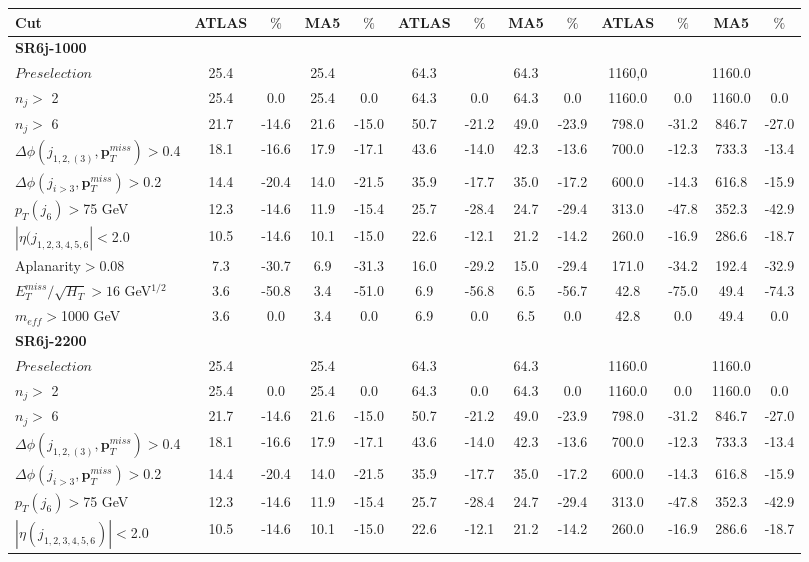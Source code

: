 \documentclass[a4paper,11pt]{article}
\begin{document}
\begin{landscape}
\begin{table}[h]
\begin{tabular}{ | l | c c c c  || c c c c || c c c c | }
			\textbf{Cut} & \textbf{ATLAS} & $\%$ & \textbf{MA5} & $\%$ & \textbf{ATLAS} & $\%$ & \textbf{MA5} & $\%$ & \textbf{ATLAS} & $\%$ & \textbf{MA5} & $\%$ \\ \hline \hline
											\multicolumn{13}{|l|}{\textbf{SR6j-1000}} \\ \hline		
$Preselection$&25.4&&25.4&&64.3&&64.3&&1160,0&&1160.0&
\\
$n_j>$ 2&25.4&0.0&25.4&0.0&64.3&0.0&64.3&0.0&1160.0&0.0&1160.0&0.0
\\
$n_j>$ 6&21.7&-14.6&21.6&-15.0&50.7&-21.2&49.0&-23.9&798.0&-31.2&846.7&-27.0
\\
$\Delta \phi(j_{1,2,(3)},\mathbf{p}_T^{miss})>$0.4&18.1&-16.6&17.9&-17.1&43.6&-14.0&42.3&-13.6&700.0&-12.3&733.3&-13.4
\\
$\Delta \phi(j_{i>3},\mathbf{p}_T^{miss})>$0.2&14.4&-20.4&14.0&-21.5&35.9&-17.7&35.0&-17.2&600.0&-14.3&616.8&-15.9
\\
$p_T(j_6)>$75 GeV&12.3&-14.6&11.9&-15.4&25.7&-28.4&24.7&-29.4&313.0&-47.8&352.3&-42.9
\\
$|\eta(j_{1,2,3,4,5,6}|<$2.0&10.5&-14.6&10.1&-15.0&22.6&-12.1&21.2&-14.2&260.0&-16.9&286.6&-18.7
\\
Aplanarity$>$0.08&7.3&-30.7&6.9&-31.3&16.0&-29.2&15.0&-29.4&171.0&-34.2&192.4&-32.9
\\
$E_T^{miss}/\sqrt{H_T}>16 $ GeV$^{1/2}$&3.6&-50.8&3.4&-51.0&6.9&-56.8&6.5&-56.7&42.8&-75.0&49.4&-74.3
\\
$m_{eff}>$1000 GeV&3.6&0.0&3.4&0.0&6.9&0.0&6.5&0.0&42.8&0.0&49.4&0.0
\\ \hline
											\multicolumn{13}{|l|}{\textbf{SR6j-2200}} \\ \hline		
$Preselection$&25.4&&25.4&&64.3&&64.3&&1160.0&&1160.0&
\\
$n_j>$ 2&25.4&0.0&25.4&0.0&64.3&0.0&64.3&0.0&1160.0&0.0&1160.0&0.0
\\
$n_j>$ 6&21.7&-14.6&21.6&-15.0&50.7&-21.2&49.0&-23.9&798.0&-31.2&846.7&-27.0
\\
$\Delta \phi(j_{1,2,(3)},\mathbf{p}_T^{miss})>$0.4&18.1&-16.6&17.9&-17.1&43.6&-14.0&42.3&-13.6&700.0&-12.3&733.3&-13.4
\\
$\Delta \phi(j_{i>3},\mathbf{p}_T^{miss})>$0.2&14.4&-20.4&14.0&-21.5&35.9&-17.7&35.0&-17.2&600.0&-14.3&616.8&-15.9
\\
$p_T(j_6)>$75 GeV&12.3&-14.6&11.9&-15.4&25.7&-28.4&24.7&-29.4&313.0&-47.8&352.3&-42.9
\\
$|\eta(j_{1,2,3,4,5,6})|<$2.0&10.5&-14.6&10.1&-15.0&22.6&-12.1&21.2&-14.2&260.0&-16.9&286.6&-18.7

\end{tabular}
\end{table}
\end{landscape}
\end{document}

